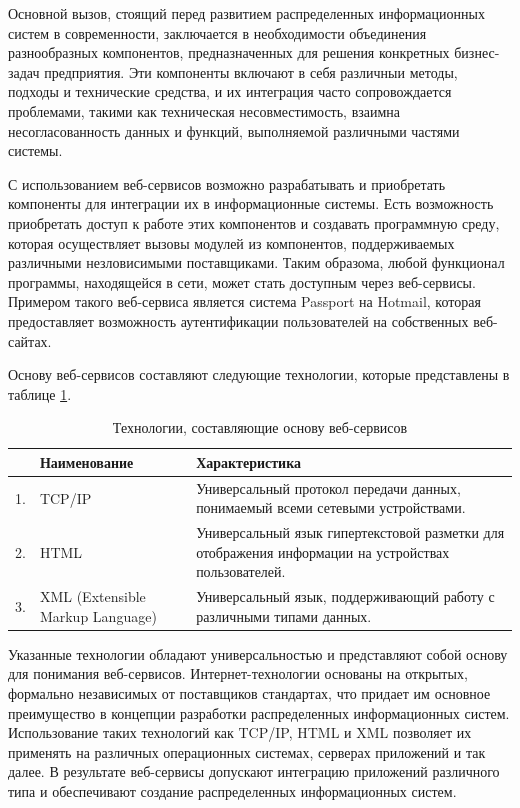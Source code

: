 \documentclass[report, draught]{fefudoc}
\begin{document}
Основной вызов, стоящий перед развитием распределенных информационных систем в современности, заключается в необходимости объединения разнообразных компонентов, предназначенных для решения конкретных бизнес-задач предприятия. Эти компоненты включают в себя различныи методы, подходы и технические средства, и их интеграция часто сопровождается проблемами, такими как техническая несовместимость, взаимна несогласованность данных и функций, выполняемой различными частями системы.

С использованием веб-сервисов возможно разрабатывать и приобретать компоненты для интеграции их в информационные системы. Есть возможность приобретать доступ к работе этих компонентов и создавать программную среду, которая осуществляет вызовы модулей из компонентов, поддерживаемых различными незловисимыми поставщиками. Таким образома, любой функционал программы, находящейся в сети, может стать доступным через веб-сервисы. Примером такого веб-сервиса является система Passport на Hotmail, которая предоставляет возможность аутентификации пользователей на собственных веб-сайтах.

Основу веб-сервисов составляют следующие технологии, которые представлены в таблице \ref{tab_tech}.
\begin{table}
\caption{Технологии, составляющие основу веб-сервисов}
\label{tab_tech}
\begin{tabularx}{\textwidth}{|l|l|X|}
\hline
& Наименование & Характеристика \\
\hline
1. & TCP/IP & Универсальный протокол передачи данных, понимаемый всеми сетевыми устройствами. \\
\hline
2. & HTML & Универсальный язык гипертекстовой разметки для отображения информации на устройствах пользователей. \\
\hline
3. & XML (Extensible Markup Language) & Универсальный язык, поддерживающий работу с различными типами данных.\\
\hline
\end{tabularx}
\end{table}

Указанные технологии обладают универсальностью и представляют собой основу для понимания веб-сервисов. Интернет-технологии основаны на открытых, формально независимых от поставщиков стандартах, что придает им основное преимущество в концепции разработки распределенных информационных систем. Использование таких технологий как TCP/IP, HTML и XML позволяет их применять на различных операционных системах, серверах приложений и так далее. В результате веб-сервисы допускают интеграцию приложений различного типа и обеспечивают создание распределенных информационных систем.
\end{document}
